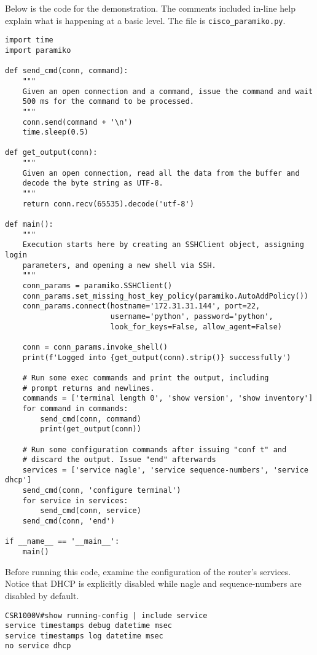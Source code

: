 Below is the code for the demonstration. The comments included in-line help
explain what is happening at a basic level. The file is \verb|cisco_paramiko.py|.

\begin{verbatim}
import time
import paramiko

def send_cmd(conn, command):
    """
    Given an open connection and a command, issue the command and wait
    500 ms for the command to be processed.
    """
    conn.send(command + '\n')
    time.sleep(0.5)

def get_output(conn):
    """
    Given an open connection, read all the data from the buffer and
    decode the byte string as UTF-8.
    """
    return conn.recv(65535).decode('utf-8')

def main():
    """
    Execution starts here by creating an SSHClient object, assigning login
    parameters, and opening a new shell via SSH.
    """
    conn_params = paramiko.SSHClient()
    conn_params.set_missing_host_key_policy(paramiko.AutoAddPolicy())
    conn_params.connect(hostname='172.31.31.144', port=22,
                        username='python', password='python',
                        look_for_keys=False, allow_agent=False)

    conn = conn_params.invoke_shell()
    print(f'Logged into {get_output(conn).strip()} successfully')

    # Run some exec commands and print the output, including
    # prompt returns and newlines.
    commands = ['terminal length 0', 'show version', 'show inventory']
    for command in commands:
        send_cmd(conn, command)
        print(get_output(conn))

    # Run some configuration commands after issuing "conf t" and
    # discard the output. Issue "end" afterwards
    services = ['service nagle', 'service sequence-numbers', 'service dhcp']
    send_cmd(conn, 'configure terminal')
    for service in services:
        send_cmd(conn, service)
    send_cmd(conn, 'end')

if __name__ == '__main__':
    main()
\end{verbatim}

Before running this code, examine the configuration of the router's services.
Notice that DHCP is explicitly disabled while nagle and sequence-numbers are
disabled by default.

\begin{verbatim}
CSR1000V#show running-config | include service
service timestamps debug datetime msec
service timestamps log datetime msec
no service dhcp
\end{verbatim}

